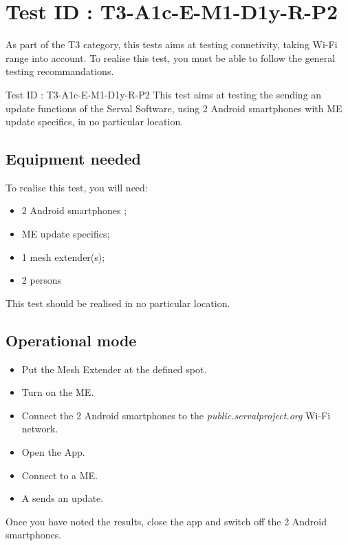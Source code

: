 \documentclass[oneside]{book}
\begin{document}
\section{Test ID : T3-A1c-E-M1-D1y-R-P2}
\begin{itshape}
As part of the T3 category, this tests aims at testing connetivity, taking Wi-Fi range into account.
To realise this test, you must be able to follow the general testing recommandations.
\end{itshape}
\newline
Test ID : T3-A1c-E-M1-D1y-R-P2
 This test aims at testing the sending an update functions of the Serval Software, using 2 Android smartphones with ME update specifics, in no particular location.
\subsection{Equipment needed} To realise this test, you will need:
\begin{itemize}
\item 2 Android smartphones ;
\item ME update specifics;
\item 1 mesh extender(s);
\item 2 persons
\end{itemize}
This test should be realised in no particular location.
\subsection{Operational mode} \begin{itemize}
\item Put the Mesh Extender at the defined spot.
\item Turn on the ME.
\item Connect the 2 Android smartphones to the \emph{public.servalproject.org} Wi-Fi network.
\item Open the App.
\item Connect to a ME.
\item A sends an update.
\end{itemize}
Once you have noted the results, close the app and switch off the 2 Android smartphones.
\end{document}
